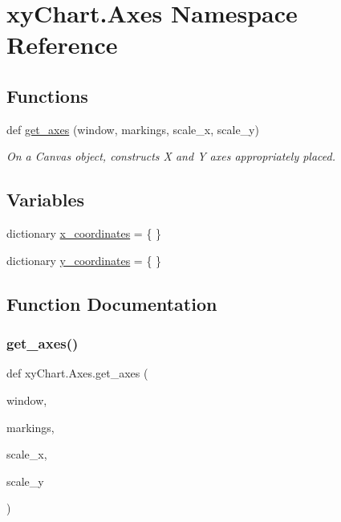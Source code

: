 \hypertarget{namespacexy_chart_1_1_axes}{}\section{xy\+Chart.\+Axes Namespace Reference}
\label{namespacexy_chart_1_1_axes}
\subsection*{Functions}
\begin{DoxyCompactItemize}
\item 
def \hyperlink{namespacexy_chart_1_1_axes_a0e4135e0b6ce42f16613edb584cc2068}{get\+\_\+axes} (window, markings, scale\+\_\+x, scale\+\_\+y)
\begin{DoxyCompactList}\small\item\em On a Canvas object, constructs X and Y axes appropriately placed. \end{DoxyCompactList}\end{DoxyCompactItemize}
\subsection*{Variables}
\begin{DoxyCompactItemize}
\item 
dictionary \hyperlink{namespacexy_chart_1_1_axes_a2f108bb550a6dcdc0444e9b0917b9c83}{x\+\_\+coordinates} = \{ \}
\item 
dictionary \hyperlink{namespacexy_chart_1_1_axes_a9a3b65bbb97a9d0cd1f94838956b2972}{y\+\_\+coordinates} = \{ \}
\end{DoxyCompactItemize}


\subsection{Function Documentation}
\hypertarget{namespacexy_chart_1_1_axes_a0e4135e0b6ce42f16613edb584cc2068}{}\label{namespacexy_chart_1_1_axes_a0e4135e0b6ce42f16613edb584cc2068} 
\subsubsection{\texorpdfstring{get\+\_\+axes()}{get\_axes()}}
{\footnotesize\ttfamily def xy\+Chart.\+Axes.\+get\+\_\+axes (\begin{DoxyParamCaption}\item[{}]{window,  }\item[{}]{markings,  }\item[{}]{scale\+\_\+x,  }\item[{}]{scale\+\_\+y }\end{DoxyParamCaption})}



